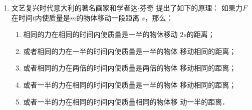 \begin{exercises}
\begin{enumerate}
          \begin{figure}[H]\centering
              \caption{}
          \end{figure}

          \begin{solution}
              推进器的推力使宇宙飞船和火箭组产生的加速度
              \[a=\frac{\SI{0.91}{m/s}}{\SI{7.0}{s}}=\SI{0.13}{m/s^2} \]
              根据牛顿第二定律得
              \[F=ma=(m_1+m_2)a \]
              所以
              \[m_2=\frac{F}{a}-m_1=\frac{895}{0.13}\si{kg}-\SI{3400}{kg}=\SI{3500}{kg} \]
              实际上，火箭组的质量已经被独立地测出．实验的目的是要发展一种技术，找出轨道中另一个国家的人造卫星的未知质量．事先已测出火箭组的质量为\SI{3660}{kg}，因而实验误差在5\% 以内，正好在预期的误差范围之内．
          \end{solution}

    \item 文艺复兴时代意大利的著名画家和学者达$\cdot$芬奇
          提出了如下的原理：
          如果力$F$在时间$t$内使质量是$m$的物体移动一段距离
          $s$，那么：

          \begin{minipage}[b]{1\textwidth}
              \begin{enumerate}[(1)]
                  \item 相同的力在相同的时间内使质量是一半的物休移动
                        $2s$的距离；
                  \item   或者相同的力在一半的时间内使质量是一半的物体
                        移动相同的距离；
                  \item   或者相同的力在两倍的时间内使质量是两倍的物体
                        移动相同的距离；
                  \item   或者一半的力在相同的时间内使质量是一半的物体
                        移动相同的距离；
                  \item   或者一半的力在相同的时间内使质量相同的物体移
                        动一半的距离．
              \end{enumerate}
          \end{minipage}


\end{enumerate}
\end{exercises}
